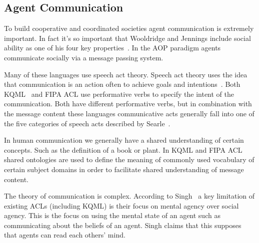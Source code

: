 \documentclass[]{final_report}
\begin{document}
\subsection{Agent Communication}
To build cooperative and coordinated societies agent communication is extremely important. In fact it's so important that Wooldridge and Jennings include social ability as one of his four key properties~\cite{wooldridge_jennings_1995}. In the AOP paradigm agents communicate socially via a message passing system.\par 
Many of these languages use speech act theory. Speech act theory uses the idea that communication is an action often to achieve goals and intentions~\cite{austin1975things}. Both KQML~\cite{finin1994kqml} and FIPA ACL use performative verbs to specify the intent of the communication. Both have different performative verbs, but in combination with the message content these languages communicative acts generally fall into one of the five categories of speech acts described by Searle~\cite{searle1969speech}.\par 
In human communication we generally have a shared understanding of certain concepts. Such as the definition of a book or plant. In KQML and FIPA ACL shared ontologies are used to define the meaning of commonly used vocabulary of certain subject domains in order to facilitate shared understanding of message content.\par 
The theory of communication is complex. According to Singh~\cite{singh1998agent} a key limitation of existing ACLs (including KQML) is their focus on mental agency over social agency. This is the focus on using the mental state of an agent such as communicating about the beliefs of an agent. Singh claims that this supposes that agents can read each others' mind.
\end{document}
